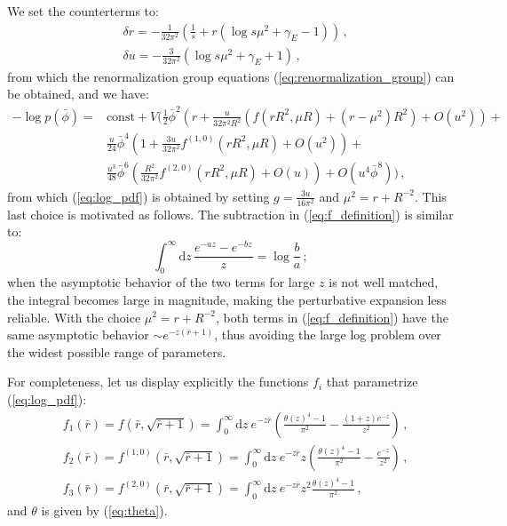 \documentclass[11pt,a4paper]{article}
\newcommand{\dd}{\mathrm{d}}
\begin{document}
We set the counterterms to:
\begin{align}
    &\delta r = -\frac{1}{32\pi^2}\left(\frac{1}{s} + r\left(\log s \mu^2 + \gamma_E - 1\right)\right)\,,\\
    &\delta u = -\frac{3}{32\pi^2}\left(\log s\mu^2 +\gamma_E + 1\right)\,,
\end{align}
from which the renormalization group equations (\ref{eq:renormalization_group})
can be obtained, and we have:
\begin{equation}
\begin{split}
    -\log p(\bar{\phi}) =& \mathrm{const}+ V \Bigg(
    \frac{1}{2} \bar{\phi}^2\left( r + \frac{u}{32\pi^2R^2}  \left(f(rR^2, \mu R) + (r - \mu^2)R^2\right) + O(u^2)\right) + \\
    &\frac{u}{24} \bar{\phi}^4 \left(1 + \frac{3u}{32\pi^2} f^{(1, 0)}(rR^2, \mu R) + O(u^2)\right) + \\
    &\frac{u^3}{48}\bar{\phi}^6\left(\frac{R^2}{32\pi^2}f^{(2, 0)}(rR^2, \mu R) + O(u)\right) + O(u^4 \bar{\phi}^8) \Bigg)\,,
\end{split}
\end{equation}
from which (\ref{eq:log_pdf}) is obtained by setting $g = \frac{3 u}{16
\pi^2}$ and $\mu^2 = r + R^{-2}$. This last choice is motivated as follows. The
subtraction in (\ref{eq:f_definition}) is similar to:
\begin{equation}
    \int_0^{\infty} \dd z\, \frac{e^{-a z} - e^{-b z}}{z} = \log \frac{b}{a}\,;
\end{equation}
when the asymptotic behavior of the two terms for large $z$ is not well
matched, the integral becomes large in magnitude, making the perturbative
expansion less reliable. With the choice $\mu^2 = r + R^{-2}$, both terms in
(\ref{eq:f_definition}) have the same asymptotic behavior $\sim e^{-z(\bar{r} +
1)}$, thus avoiding the large log problem over the widest possible range of
parameters.

For completeness, let us display explicitly the functions $f_i$ that
parametrize (\ref{eq:log_pdf}):
\begin{align}
\label{eq:f_functions}
    &f_1(\bar r) = f(\bar r, \sqrt{\bar r + 1}) = 
    \int_{0}^{\infty} \dd z\ e^{-z \bar{r}} \left(\frac{\theta(z)^4 - 1}{\pi^2} - 
    \frac{(1 + z) e^{-z}}{z^2}\right)\,,\\
    &f_2(\bar r) = f^{(1, 0)}(\bar r, \sqrt{\bar r + 1}) = 
    \int_{0}^{\infty} \dd z\ e^{-z \bar{r}} z \left(\frac{\theta(z)^4 - 1}{\pi^2} - 
    \frac{e^{-z}}{z^2}\right)\,,\\
    &f_3(\bar r) = f^{(2, 0)}(\bar r, \sqrt{\bar r + 1}) = 
    \int_{0}^{\infty} \dd z\ e^{-z \bar{r}} z^2 \frac{\theta(z)^4 - 1}{\pi^2}\,,
\end{align}
and $\theta$ is given by (\ref{eq:theta}).
\end{document}
